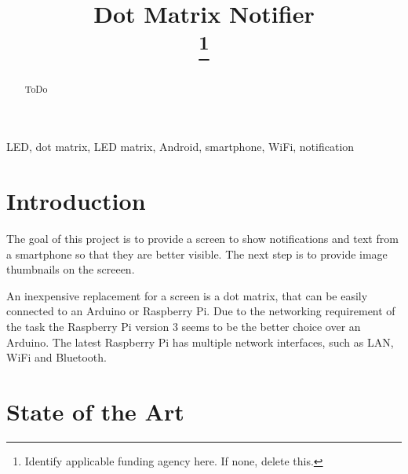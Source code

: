 \documentclass[conference]{IEEEtran}
\begin{document}
\title{Dot Matrix Notifier\\
\thanks{Identify applicable funding agency here. If none, delete this.}
}

\author{
\and
{}
\and
{}
}

\maketitle

\begin{abstract}
ToDo
\end{abstract}


\begin{IEEEkeywords}
LED, dot matrix, LED matrix, Android, smartphone, WiFi, notification
\end{IEEEkeywords}


\section{Introduction}
The goal of this project is to provide a screen to show notifications and text from a smartphone so that they are better visible. The next step is to provide image thumbnails on the screeen.

An inexpensive replacement for a screen is a dot matrix, that can be easily connected to an Arduino or Raspberry Pi. Due to the networking requirement of the task the Raspberry Pi version 3 seems to be the better choice over an Arduino. The latest Raspberry Pi has multiple network interfaces, such as LAN, WiFi and Bluetooth.


\section{State of the Art}
\end{document}

